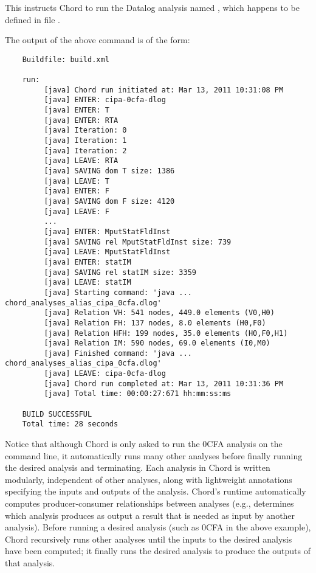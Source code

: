 This instructs Chord to run the Datalog analysis named ,
which happens to be defined in file .

The output of the above command is of the form:

\begin{framed}
{\small
\begin{verbatim}
    Buildfile: build.xml

    run:
         [java] Chord run initiated at: Mar 13, 2011 10:31:08 PM
         [java] ENTER: cipa-0cfa-dlog
         [java] ENTER: T
         [java] ENTER: RTA
         [java] Iteration: 0
         [java] Iteration: 1
         [java] Iteration: 2
         [java] LEAVE: RTA
         [java] SAVING dom T size: 1386
         [java] LEAVE: T
         [java] ENTER: F
         [java] SAVING dom F size: 4120
         [java] LEAVE: F
         ...
         [java] ENTER: MputStatFldInst
         [java] SAVING rel MputStatFldInst size: 739
         [java] LEAVE: MputStatFldInst
         [java] ENTER: statIM
         [java] SAVING rel statIM size: 3359
         [java] LEAVE: statIM
         [java] Starting command: 'java ... chord_analyses_alias_cipa_0cfa.dlog'
         [java] Relation VH: 541 nodes, 449.0 elements (V0,H0)
         [java] Relation FH: 137 nodes, 8.0 elements (H0,F0)
         [java] Relation HFH: 199 nodes, 35.0 elements (H0,F0,H1)
         [java] Relation IM: 590 nodes, 69.0 elements (I0,M0)
         [java] Finished command: 'java ... chord_analyses_alias_cipa_0cfa.dlog'
         [java] LEAVE: cipa-0cfa-dlog
         [java] Chord run completed at: Mar 13, 2011 10:31:36 PM
         [java] Total time: 00:00:27:671 hh:mm:ss:ms

    BUILD SUCCESSFUL
    Total time: 28 seconds
\end{verbatim}
}
\end{framed}

Notice that although Chord is only asked to run the 0CFA analysis on the command line, it automatically
runs many other analyses before finally running the desired analysis and terminating.
Each analysis in Chord is written modularly, independent of other analyses, along with lightweight
annotations specifying the inputs and outputs of the analysis.  Chord's runtime automatically computes
producer-consumer relationships between analyses (e.g., determines which analysis produces as output a
result that is needed as input by another analysis).  Before running a desired analysis
(such as 0CFA in the above example), Chord recursively runs other analyses until the
inputs to the desired analysis have been computed; it finally runs the desired analysis to produce
the outputs of that analysis.

